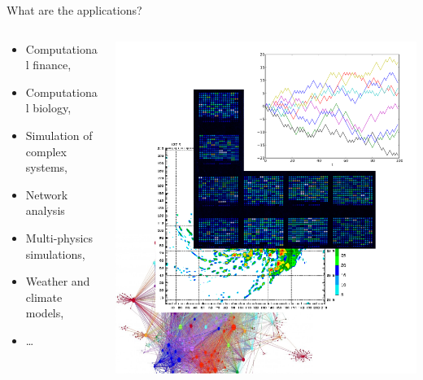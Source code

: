 \documentclass{beamer}
\begin{document}
\begin{frame}{What are the applications?}
	\centering
	\begin{columns}
		\begin{column}{0.5\textwidth}
		\begin{itemize}
		\item Computational finance,
		\item Computational biology,
		\item Simulation of complex systems,
		\item Network analysis
		\item Multi-physics simulations,
		\item Weather and climate models,
		\item \ldots 
		\end{itemize}
		\end{column}
		\begin{column}{0.5\textwidth}
			\includegraphics[width=\columnwidth]{applications.png}
		\end{column}
	\end{columns}
	\vfill
\end{frame}
\end{document}
